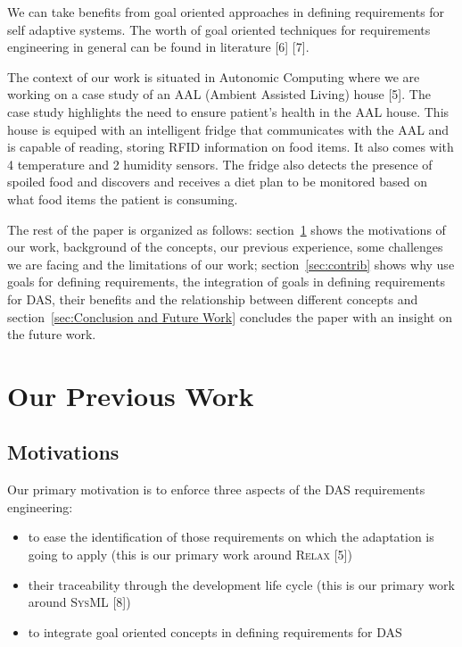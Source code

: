 \documentclass[10pt, conference, compsocconf]{IEEEtran}
\def\myrelax{\textsc{Relax}}                  %
\def\sysml{\textsc{SysML}}
\newcommand{\Mysec}[1]{section~\ref{sec:#1}}
\begin{document}
We can take benefits from goal oriented approaches in defining requirements for self adaptive systems. The worth of goal oriented techniques for requirements engineering in general can be found in literature [6] [7]. 

The context of our work is situated in Autonomic Computing where we are working on a case study of an AAL (Ambient Assisted Living) house [5]. The case study highlights the need to ensure patient's health in the AAL house. This house is equiped with an intelligent fridge that communicates with the AAL and is capable of reading, storing RFID information on food items. It also comes with 4 temperature and 2 humidity sensors. The fridge also detects the presence of spoiled food and discovers and receives a diet plan to be monitored based on what food items the patient is consuming. 


The rest of the paper is organized as follows: \Mysec{Our Previous Work} shows the motivations of our work, background of the concepts, our previous experience, some challenges we are facing and the limitations of our work; \Mysec{contrib} shows why use goals for defining requirements, the integration of goals in defining requirements  for DAS, their benefits and the relationship between different concepts and \Mysec{Conclusion and Future Work} concludes the paper with an insight on the future work.

\section{Our Previous Work}\label{sec:Our Previous Work}

\subsection{Motivations}

Our primary motivation is to enforce three aspects of the DAS requirements engineering:
\begin{itemize}
\item to ease the identification of those requirements on which the adaptation is going to apply (this is our primary work around \myrelax{} [5])
\item their traceability through the development life cycle (this is our primary work around \sysml{} [8])
\item to integrate goal oriented  concepts in defining requirements for DAS
\end{itemize}
\end{document}
